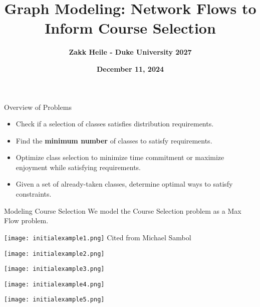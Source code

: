 \documentclass{beamer}
\title{\textbf{Graph Modeling: Network Flows to Inform Course Selection}}
\author{\textbf{Zakk Heile - Duke University 2027} }
\date{\textbf{December 11, 2024}}
\begin{document}
\begin{frame}
    \titlepage
\end{frame}

\begin{frame}{Overview of Problems}
    \begin{itemize}
        \item Check if a selection of classes satisfies distribution requirements.
        \item Find the \textbf{minimum number} of classes to satisfy requirements.
        \item Optimize class selection to minimize time commitment or maximize enjoyment while satisfying requirements.
        \item Given a set of already-taken classes, determine optimal ways to satisfy constraints.
    \end{itemize}

    
\end{frame}

\begin{frame}{Modeling Course Selection}
    \centering
    \LARGE We model the Course Selection problem as a Max Flow problem.
    
\end{frame}

\begin{frame}
    \centering
    \texttt{[image: initialexample1.png]}
    \vspace{0.5cm}
    \tiny{Cited from Michael Sambol}
    
\end{frame}

\begin{frame}
    \centering
    \texttt{[image: initialexample2.png]}
\end{frame}

\begin{frame}
    \centering
    \texttt{[image: initialexample3.png]}
\end{frame}

\begin{frame}
    \centering
    \texttt{[image: initialexample4.png]}
\end{frame}

\begin{frame}
    \centering
    \texttt{[image: initialexample5.png]}
\end{frame}
\end{document}
